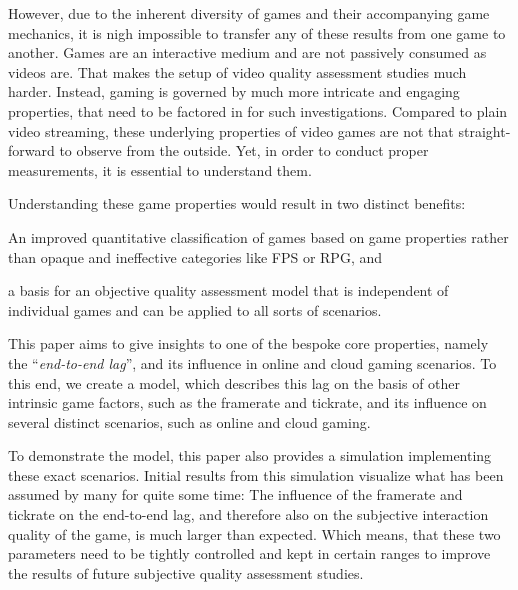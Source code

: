 However, due to the inherent diversity of games and their accompanying game mechanics, it is nigh impossible to transfer any of these results from one game to another. Games are an interactive medium and are not passively consumed as videos are. That makes the setup of video quality assessment studies much harder. Instead, gaming is governed by much more intricate and engaging properties, that need to be factored in for such investigations. Compared to plain video streaming, these underlying properties of video games are not that straight-forward to observe from the outside. Yet, in order to conduct proper measurements, it is essential to understand them.

Understanding these game properties would result in two distinct benefits:
\begin{enumerate*}
	\item An improved quantitative classification of games based on game properties rather than opaque and ineffective categories like \gls{FPS} or \gls{RPG}, and
	\item a basis for an objective quality assessment model that is independent of individual games and can be applied to all sorts of scenarios.
\end{enumerate*}

This paper aims to give insights to one of the bespoke core properties, namely the ``\textit{end-to-end lag}'', and its influence in online and cloud gaming scenarios. To this end, we create a model, which describes this lag on the basis of other intrinsic game factors, such as the framerate and tickrate, and its influence on several distinct scenarios, such as online and cloud gaming.

To demonstrate the model, this paper also provides a simulation implementing these exact scenarios. Initial results from this simulation visualize what has been assumed by many for quite some time: The influence of the framerate and tickrate on the end-to-end lag, and therefore also on the subjective interaction quality of the game, is much larger than expected. Which means, that these two parameters need to be tightly controlled and kept in certain ranges to improve the results of future subjective quality assessment studies.

